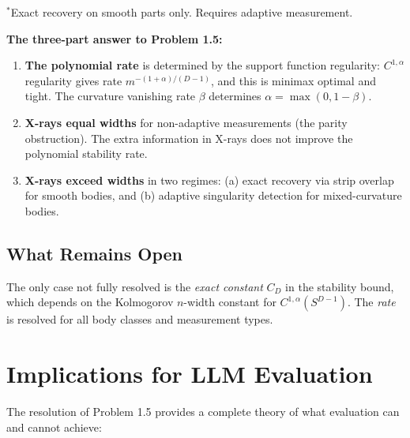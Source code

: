 {\small $^*$Exact recovery on smooth parts only. Requires adaptive measurement.}

\bigskip

\textbf{The three-part answer to Problem 1.5:}

\begin{enumerate}
  \item \textbf{The polynomial rate} is determined by the support function regularity: $C^{1,\alpha}$ regularity gives rate $m^{-(1+\alpha)/(D-1)}$, and this is minimax optimal and tight. The curvature vanishing rate $\beta$ determines $\alpha = \max(0, 1-\beta)$.
  
  \item \textbf{X-rays equal widths} for non-adaptive measurements (the parity obstruction). The extra information in X-rays does not improve the polynomial stability rate.
  
  \item \textbf{X-rays exceed widths} in two regimes: (a) exact recovery via strip overlap for smooth bodies, and (b) adaptive singularity detection for mixed-curvature bodies.
\end{enumerate}

\subsection{What Remains Open}

The only case not fully resolved is the \emph{exact constant} $C_D$ in the stability bound, which depends on the Kolmogorov $n$-width constant for $C^{1,\alpha}(S^{D-1})$. The \emph{rate} is resolved for all body classes and measurement types.


\section{Implications for LLM Evaluation}

The resolution of Problem 1.5 provides a complete theory of what evaluation can and cannot achieve:

